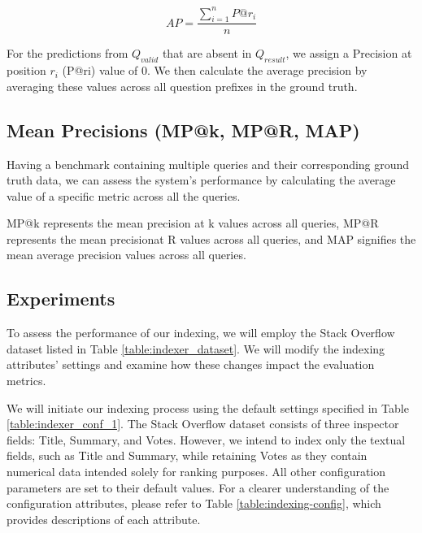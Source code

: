 {\begin{equation}
AP = \frac{\sum_{i=1}^{n} P@r_i}{n}
\label{eq:depth}
\end{equation}

For the predictions from $Q_{valid}$ that are absent in $Q_{result}$, we assign a Precision at position $r_i $ (P@ri) value of 0. We then calculate the average precision by averaging these values across all question prefixes in the ground truth.

\subsection*{Mean Precisions (MP@k, MP@R, MAP)}
Having a benchmark containing multiple queries and their corresponding ground truth data, we can assess the system's performance by calculating the average value of a specific metric across all the queries.

MP@k represents the mean precision at k values across all queries, MP@R represents the mean precisionat R values across all queries, and MAP signifies the mean average precision values across all queries.

\subsection{Experiments}
 
 To assess the performance of our indexing, we will employ the Stack Overflow dataset listed in Table \ref{table:indexer_dataset}. We will modify the indexing attributes' settings and examine how these changes impact the evaluation metrics.
 
 We will initiate our indexing process using the default settings specified in Table \ref{table:indexer_conf_1}. The Stack Overflow dataset consists of three inspector fields: Title, Summary, and Votes. However, we intend to index only the textual fields, such as Title and Summary, while retaining Votes as they contain numerical data intended solely for ranking purposes. All other configuration parameters are set to their default values. For a clearer understanding of the configuration attributes, please refer to Table \ref{table:indexing-config}, which provides descriptions of each attribute.
 


}
